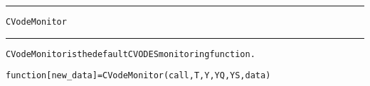 \begin{samepage}
\hrule
\begin{center}
{\large \verb!CVodeMonitor!}
\label{p:CVodeMonitor}
\end{center}
\hrule\vspace{0.1in}



\begin{alltt}
CVodeMonitor is the default CVODES monitoring function.
\end{alltt}

\end{samepage}



\begin{samepage}


\begin{alltt}
function [new_data] = CVodeMonitor(call, T, Y, YQ, YS, data) 
\end{alltt}

\end{samepage}



